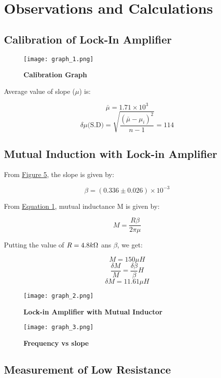 \section{Observations and Calculations}
	\subsection{Calibration of Lock-In Amplifier}
		

		\begin{figure}[H]
			\centering
			\texttt{[image: graph\_1.png]}
			\caption{\textbf{Calibration Graph}}
			\label{graph:1}
		\end{figure}

		Average value of slope ($\mu$) is:

		$$\bar{\mu} = 1.71\times10^3$$
		$$\delta\mu \text{(S.D)} = \sqrt{\frac{(\bar{\mu}-\mu_i)^2}{n-1}} = 114$$

	\subsection{Mutual Induction with Lock-in Amplifier}
		

		From \hyperref[graph:3]{Figure 5}, the slope is given by:

		$$\beta = (0.336 \pm 0.026)\times10^{-3}$$

		From \hyperref[eqn:1]{Equation 1}, mutual inductance M is given by:

		$$M = \frac{R\beta}{2\pi\mu}$$

		Putting the value of $R = 4.8k\ohm$ ans $\beta$, we get:

		$$M = 150\mu H$$
		$$\frac{\delta M}{M} = \frac{\delta\beta}{\beta} H$$
		$$\delta M = 11.61\mu H$$

		\begin{figure}[H]
			\centering
			\texttt{[image: graph\_2.png]}
			\caption{\textbf{Lock-in Amplifier with Mutual Inductor}}
			\label{graph:2}
		\end{figure}

		\begin{figure}[H]
			\centering
			\texttt{[image: graph\_3.png]}
			\caption{\textbf{Frequency vs slope}}
			\label{graph:3}
		\end{figure}
	
	\subsection{Measurement of Low Resistance}
		

